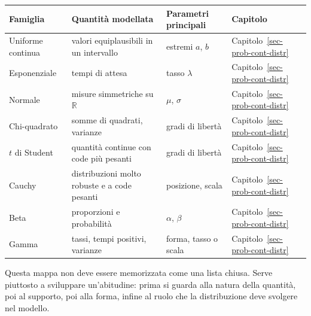 \documentclass[
  italian,
  letterpaper,
  a4paper,
  11pt,
  open=any]{scrbook}
\newcounter{none} %
\theoremstyle{plain}
\theoremstyle{definition}
\theoremstyle{definition}
\theoremstyle{remark}
\begin{document}
{\def\LTcaptype{none} %
\begin{longtable}[]{@{}
  >{\raggedright\arraybackslash}p{}
  >{\raggedright\arraybackslash}p{}
  >{\raggedright\arraybackslash}p{}
  >{\raggedright\arraybackslash}p{}@{}}
\toprule\noalign{}
\begin{minipage}[b]{\linewidth}\raggedright
Famiglia
\end{minipage} & \begin{minipage}[b]{\linewidth}\raggedright
Quantità modellata
\end{minipage} & \begin{minipage}[b]{\linewidth}\raggedright
Parametri principali
\end{minipage} & \begin{minipage}[b]{\linewidth}\raggedright
Capitolo
\end{minipage} \\
\midrule\noalign{}
\endhead
\bottomrule\noalign{}
\endlastfoot
Uniforme continua & valori equiplausibili in un intervallo & estremi
\(a\), \(b\) & Capitolo~\ref{sec-prob-cont-distr} \\
Esponenziale & tempi di attesa & tasso \(\lambda\) &
Capitolo~\ref{sec-prob-cont-distr} \\
Normale & misure simmetriche su \(\mathbb{R}\) & \(\mu\), \(\sigma\) &
Capitolo~\ref{sec-prob-cont-distr} \\
Chi-quadrato & somme di quadrati, varianze & gradi di libertà &
Capitolo~\ref{sec-prob-cont-distr} \\
\(t\) di Student & quantità continue con code più pesanti & gradi di
libertà & Capitolo~\ref{sec-prob-cont-distr} \\
Cauchy & distribuzioni molto robuste e a code pesanti & posizione, scala
& Capitolo~\ref{sec-prob-cont-distr} \\
Beta & proporzioni e probabilità & \(\alpha\), \(\beta\) &
Capitolo~\ref{sec-prob-cont-distr} \\
Gamma & tassi, tempi positivi, varianze & forma, tasso o scala &
Capitolo~\ref{sec-prob-cont-distr} \\
\end{longtable}
}

Questa mappa non deve essere memorizzata come una lista chiusa. Serve
piuttosto a sviluppare un'abitudine: prima si guarda alla natura della
quantità, poi al supporto, poi alla forma, infine al ruolo che la
distribuzione deve svolgere nel modello.
\end{document}
